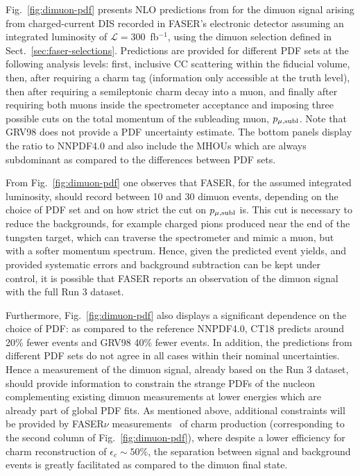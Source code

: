 Fig.~\ref{fig:dimuon-pdf} presents NLO predictions from \powhegtwo for the dimuon signal arising from charged-current DIS recorded in FASER's electronic detector assuming an integrated luminosity of $\mathcal{L}=300$~fb$^{-1}$, using the dimuon selection defined in Sect.~\ref{sec:faser-selections}.
 Predictions are provided for different PDF sets at the following analysis levels: first, inclusive CC scattering within the fiducial volume, then, after requiring a charm tag (information only accessible at the truth level), then after requiring a semileptonic charm decay into a muon, and finally after requiring both muons inside the spectrometer acceptance and imposing three possible cuts on the total momentum of the subleading muon, $p_{\mu,\rm subl}$.   
 Note that GRV98 does not provide a PDF uncertainty estimate.
%
The bottom panels display the ratio to NNPDF4.0 and also include the MHOUs which are always subdominant as compared to the differences between PDF sets. 

From Fig.~\ref{fig:dimuon-pdf} one observes that FASER, for the assumed integrated luminosity, should record between 10 and 30 dimuon events, depending on the choice of PDF set and on how strict the cut on $p_{\mu,\rm subl}$ is.
%
This cut is necessary to reduce the backgrounds, for example charged pions produced near the end of the tungsten target, which can traverse the spectrometer and mimic a muon, but with a softer momentum spectrum. 
%
Hence, given the predicted event yields, and provided systematic errors and background subtraction can be kept under control, it is possible that FASER reports an observation of the dimuon signal with the full Run 3 dataset.

Furthermore, Fig.~\ref{fig:dimuon-pdf} also displays a significant dependence on the choice of PDF: as compared to the reference NNPDF4.0, CT18 predicts around 20\% fewer events and GRV98 40\% fewer events.
%
In addition, the predictions from different PDF sets do not agree in all cases within their nominal uncertainties. 
%
Hence a measurement of the dimuon signal, already based on the Run 3 dataset, should provide information to constrain the strange PDFs of the nucleon complementing existing dimuon measurements at lower energies which are already part of global PDF fits. 
%
As mentioned above, additional constraints will be provided by FASER$\nu$ measurements~\cite{FASER:2026charm} of charm production (corresponding to the second column of Fig.~\ref{fig:dimuon-pdf}), where despite a lower efficiency for charm reconstruction of $\epsilon_c\sim 50\%$, the separation between signal and background events is greatly facilitated as compared to the dimuon final state. 

